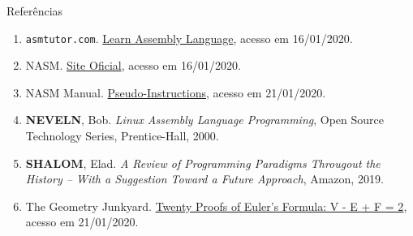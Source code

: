 \begin{frame}[fragile]{Referências}

    \begin{enumerate}
        \item \texttt{asmtutor.com}. \href{https://asmtutor.com/#lesson1}{Learn Assembly Language},
            acesso em 16/01/2020.
  
        \item NASM. \href{https://www.nasm.us/}{Site Oficial}, acesso em 16/01/2020.
 
        \item NASM Manual. \href{https://www.nasm.us/xdoc/2.09.04/html/nasmdoc3.html#section-3.2}{Pseudo-Instructions}, acesso em 21/01/2020.
 
        \item \textbf{NEVELN}, Bob. \textit{Linux Assembly Language Programming}, Open Source
            Technology Series, Prentice-Hall, 2000.

        \item \textbf{SHALOM}, Elad. \textit{A Review of Programming Paradigms Througout the 
            History -- With a Suggestion Toward a Future Approach}, Amazon, 2019.

        \item The Geometry Junkyard. \href{https://www.ics.uci.edu/~eppstein/junkyard/euler/}{Twenty Proofs of Euler's Formula: V - E + F = 2}, acesso em 21/01/2020. 

    \end{enumerate}

\end{frame}
